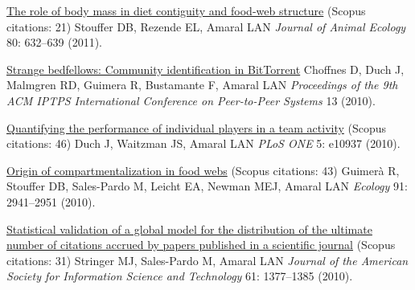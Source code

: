 \NumberedItem{\makebox[0.8cm][r]{[91]}}
\href{/people/amaral/role-body-mass-diet-contiguity-and-food-web-structure}
{The role of body mass in diet contiguity and food-web structure}
    (Scopus citations: 21)
\newline
Stouffer DB, Rezende EL, Amaral LAN
\newline
\textit{Journal of  Animal Ecology}
    80:
632--639 (2011).
\newline
\Gap
~
\Gap

\NumberedItem{\makebox[0.8cm][r]{[90]}}
\href{/people/amaral/strange-bedfellows-community-identification-bittorrent}
{Strange bedfellows: Community identification in BitTorrent}
\newline
Choffnes D, Duch J, Malmgren RD, Guimera R, Bustamante F, Amaral LAN
\newline
\textit{Proceedings of the 9th ACM IPTPS International Conference on Peer-to-Peer Systems}
13 (2010).
\newline
\Gap
~
\Gap

\NumberedItem{\makebox[0.8cm][r]{[89]}}
\href{/people/amaral/quantifying-performance-individual-players-team-activity}
{Quantifying the performance of individual players in a team activity}
    (Scopus citations: 46)
\newline
Duch J, Waitzman JS, Amaral LAN
\newline
\textit{PLoS ONE}
    5:
e10937 (2010).
\newline
\Gap
~
\Gap

\NumberedItem{\makebox[0.8cm][r]{[88]}}
\href{/people/amaral/origin-compartmentalization-food-webs}
{Origin of compartmentalization in food webs}
    (Scopus citations: 43)
\newline
Guimer\`a R, Stouffer DB, Sales-Pardo M, Leicht EA, Newman MEJ, Amaral LAN
\newline
\textit{Ecology}
    91:
2941--2951 (2010).
\newline
\Gap
~
\Gap

\NumberedItem{\makebox[0.8cm][r]{[87]}}
\href{/people/amaral/statistical-validation-global-model-distribution-ultimate-number-citations-accrued-papers-published-scientific-journal}
{Statistical validation of a global model for the distribution of the ultimate number of citations accrued by papers published in a scientific journal}
    (Scopus citations: 31)
\newline
Stringer MJ, Sales-Pardo M, Amaral LAN
\newline
\textit{Journal of the American Society for Information Science and Technology}
    61:
1377--1385 (2010).
\newline
\Gap
~
\Gap

